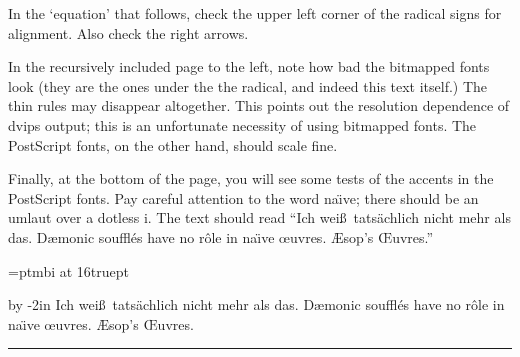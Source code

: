 {{{{{In the `equation' that follows, check the upper left corner of the radical
signs for alignment.  Also check the right arrows.

In the recursively included page to the left,
note how bad the bitmapped fonts look
(they are the ones under the the radical, and indeed this text itself.)
The thin
rules may disappear altogether.  This points out the resolution dependence
of dvips output; this is an unfortunate necessity of using bitmapped fonts.
The PostScript fonts, on the other hand, should scale fine.

Finally, at the bottom of the page, you will see some tests of the accents in
the PostScript fonts.  Pay careful attention to the word na\"\i ve; there
should be an umlaut over a dotless i.  The text should read
``Ich wei\ss\ tats\"achlich nicht mehr als das.
D\ae monic souffl\'es have no r\^ole in na\"\i ve \oe uvres.
\AE sop's \OE uvres.''
}\hfil}
%
%
\bigskip
\font\foo=ptmbi at 16truept
\centerline{\vbox{\advance\hsize by -2in
{\foo\noindent Ich wei\ss\ tats\"achlich nicht mehr als das.
D\ae monic souffl\'es have no r\^ole in na\"\i ve \oe uvres.
\AE sop's \OE uvres.}}}
\bigskip}\vrule width 6pt}\hrule height 6pt}
\bye
